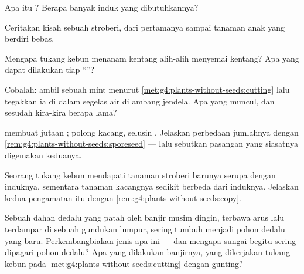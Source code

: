 \begin{exercise}[$\star$]\label{exo:g4:plants-without-seeds:5}
Apa itu ? Berapa banyak induk yang
dibutuhkannya?
\end{exercise}

\begin{exercise}[$\star$]\label{exo:g4:plants-without-seeds:6}
Ceritakan kisah sebuah  stroberi, dari  pertamanya sampai
tanaman anak yang berdiri bebas.
\end{exercise}

\begin{exercise}[$\star$]\label{exo:g4:plants-without-seeds:7}
Mengapa tukang kebun menanam kentang alih-alih menyemai  kentang?
Apa yang dapat dilakukan tiap ``''?
\end{exercise}

\begin{exercise}[$\star$]\label{exo:g4:plants-without-seeds:8}
Cobalah: ambil sebuah   mint menurut
\cref{met:g4:plants-without-seeds:cutting} lalu tegakkan ia di dalam
segelas air di ambang jendela. Apa yang muncul, dan sesudah kira-kira
berapa lama?
\end{exercise}

\begin{exercise}[$\star\star$]\label{exo:g4:plants-without-seeds:9}
 membuat jutaan ; polong kacang, selusin .
Jelaskan perbedaan jumlahnya dengan
\cref{rem:g4:plants-without-seeds:sporeseed} --- lalu sebutkan
pasangan  yang siasatnya digemakan keduanya.
\end{exercise}

\begin{exercise}[$\star\star$]\label{exo:g4:plants-without-seeds:10}
Seorang tukang kebun mendapati tanaman stroberi barunya serupa dengan
induknya, sementara tanaman kacangnya sedikit berbeda dari induknya.
Jelaskan kedua pengamatan itu dengan
\cref{rem:g4:plants-without-seeds:copy}.
\end{exercise}

\begin{exercise}[$\star\star\star$]\label{exo:g4:plants-without-seeds:11}
Sebuah dahan dedalu yang patah oleh banjir musim dingin, terbawa arus
lalu terdampar di sebuah gundukan lumpur, sering tumbuh menjadi pohon
dedalu yang baru. Perkembangbiakan jenis apa ini --- dan mengapa
sungai begitu sering dipagari pohon dedalu? Apa yang dilakukan
banjirnya, yang dikerjakan tukang kebun pada
\cref{met:g4:plants-without-seeds:cutting} dengan gunting?
\end{exercise}

